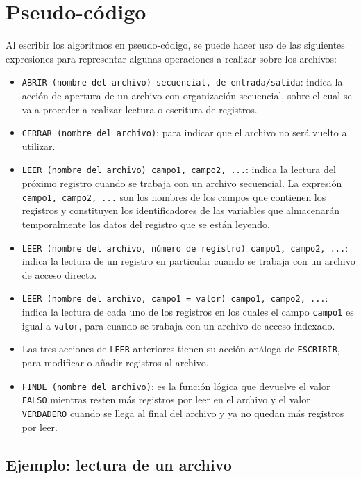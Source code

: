 \documentclass[]{book}
\providecommand{\tightlist}{%
  \setlength{\itemsep}{0pt}\setlength{\parskip}{0pt}}
\begin{document}
\hypertarget{pseudo-codigo}{%
\section{Pseudo-código}\label{pseudo-codigo}}

Al escribir los algoritmos en pseudo-código, se puede hacer uso de las siguientes expresiones para representar algunas operaciones a realizar sobre los archivos:

\begin{itemize}
\tightlist
\item
  \texttt{ABRIR\ (nombre\ del\ archivo)\ secuencial,\ de\ entrada/salida}: indica la acción de apertura de un archivo con organización secuencial, sobre el cual se va a proceder a realizar lectura o escritura de registros.
\item
  \texttt{CERRAR\ (nombre\ del\ archivo)}: para indicar que el archivo no será vuelto a utilizar.
\item
  \texttt{LEER\ (nombre\ del\ archivo)\ campo1,\ campo2,\ ...}: indica la lectura del próximo registro cuando se trabaja con un archivo secuencial. La expresión \texttt{campo1,\ campo2,\ ...} son los nombres de los campos que contienen los registros y constituyen los identificadores de las variables que almacenarán temporalmente los datos del registro que se están leyendo.
\item
  \texttt{LEER\ (nombre\ del\ archivo,\ número\ de\ registro)\ campo1,\ campo2,\ ...}: indica la lectura de un registro en particular cuando se trabaja con un archivo de acceso directo.
\item
  \texttt{LEER\ (nombre\ del\ archivo,\ campo1\ =\ valor)\ campo1,\ campo2,\ ...}: indica la lectura de cada uno de los registros en los cuales el campo \texttt{campo1} es igual a \texttt{valor}, para cuando se trabaja con un archivo de acceso indexado.
\item
  Las tres acciones de \texttt{LEER} anteriores tienen su acción análoga de \texttt{ESCRIBIR}, para modificar o añadir registros al archivo.
\item
  \texttt{FINDE\ (nombre\ del\ archivo)}: es la función lógica que devuelve el valor \texttt{FALSO} mientras resten más registros por leer en el archivo y el valor \texttt{VERDADERO} cuando se llega al final del archivo y ya no quedan más registros por leer.
\end{itemize}

\hypertarget{ejemplo-lectura-de-un-archivo}{%
\subsection{Ejemplo: lectura de un archivo}\label{ejemplo-lectura-de-un-archivo}}
\end{document}
